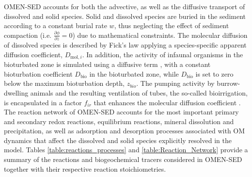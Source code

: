\documentclass[gmd, manuscript]{copernicus}
\begin{document}
OMEN-SED accounts for both the advective, as well as the diffusive transport of dissolved and solid species. Solid and dissolved species are buried in the sediment according to a constant burial rate $w$, thus 
neglecting the effect of sediment compaction (i.e. $\frac{\partial \phi}{\partial z}=0$) due to mathematical constraints. 
The molecular diffusion of dissolved species is described by Fick's law applying a species-specific apparent diffusion coefficient, $D_{\mathrm{mol},i}$.  In addition, the activity of infaunal organisms in the bioturbated zone 
is simulated using a diffusive term \citep[e.g.][]{boudreau_mathematics_1986}, with a constant bioturbation coefficient $D_{\mathrm{bio}}$ in the bioturbated zone, 
while $D_{\mathrm{bio}}$ is set to zero below the maximum bioturbation depth, $z_{bio}$. 
The pumping activity by burrow-dwelling animals and the resulting ventilation of tubes, the so-called bioirrigation, is encapsulated in a factor $f_{ir}$ that enhances the molecular diffusion coefficient 
\citep[hence, $D_{i,0}=D_{\mathrm{mol},i}\cdot f_{ir}$,][]{soetaert_model_1996}. 
The reaction network of OMEN-SED accounts for the most important primary and secondary redox reactions, equilibrium reactions, mineral dissolution and precipitation, as well as adsorption and desorption processes associated with OM dynamics 
that affect the dissolved and solid species explicitly resolved in the model. Tables \ref{table:reactions_processes} and \ref{table:Reaction_Network} provide a summary of the reactions and biogeochemical tracers considered in OMEN-SED together 
with their respective reaction stoichiometries. %
\end{document}
